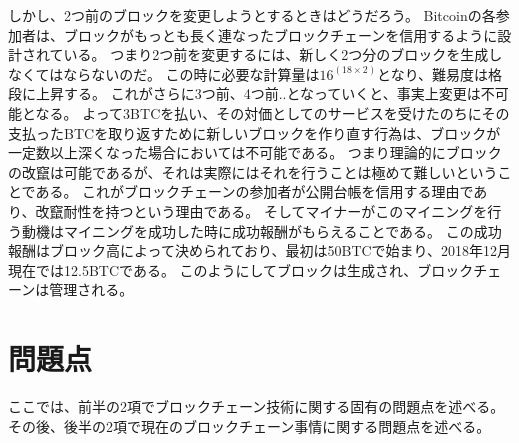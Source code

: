 しかし、2つ前のブロックを変更しようとするときはどうだろう。
Bitcoinの各参加者は、ブロックがもっとも長く連なったブロックチェーンを信用するように設計されている。
つまり2つ前を変更するには、新しく2つ分のブロックを生成しなくてはならないのだ。
この時に必要な計算量は\(16^(18\times2) \)となり、難易度は格段に上昇する。
これがさらに3つ前、4つ前..となっていくと、事実上変更は不可能となる。
よって3BTCを払い、その対価としてのサービスを受けたのちにその支払ったBTCを取り返すために新しいブロックを作り直す行為は、ブロックが一定数以上深くなった場合においては不可能である。
つまり理論的にブロックの改竄は可能であるが、それは実際にはそれを行うことは極めて難しいということである。
これがブロックチェーンの参加者が公開台帳を信用する理由であり、改竄耐性を持つという理由である。
そしてマイナーがこのマイニングを行う動機はマイニングを成功した時に成功報酬がもらえることである。
この成功報酬はブロック高によって決められており、最初は50BTCで始まり、2018年12月現在では12.5BTCである。
このようにしてブロックは生成され、ブロックチェーンは管理される。

\section{問題点}
ここでは、前半の2項でブロックチェーン技術に関する固有の問題点を述べる。
その後、後半の2項で現在のブロックチェーン事情に関する問題点を述べる。

